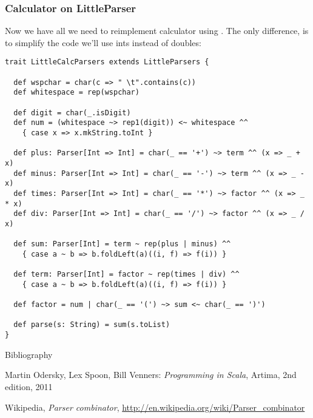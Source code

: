 \documentclass[t]{beamer}
\begin{document}
\begin{frame}[fragile]
\frametitle{Calculator on LittleParser}
Now we have all we need to reimplement calculator using .
The only difference, is to simplify the code we'll use ints instead of doubles:
\begin{lstlisting}
trait LittleCalcParsers extends LittleParsers {

  def wspchar = char(c => " \t".contains(c))
  def whitespace = rep(wspchar)

  def digit = char(_.isDigit)
  def num = (whitespace ~> rep1(digit)) <~ whitespace ^^
    { case x => x.mkString.toInt }

  def plus: Parser[Int => Int] = char(_ == '+') ~> term ^^ (x => _ + x)
  def minus: Parser[Int => Int] = char(_ == '-') ~> term ^^ (x => _ - x)
  def times: Parser[Int => Int] = char(_ == '*') ~> factor ^^ (x => _ * x)
  def div: Parser[Int => Int] = char(_ == '/') ~> factor ^^ (x => _ / x)

  def sum: Parser[Int] = term ~ rep(plus | minus) ^^
    { case a ~ b => b.foldLeft(a)((i, f) => f(i)) }

  def term: Parser[Int] = factor ~ rep(times | div) ^^
    { case a ~ b => b.foldLeft(a)((i, f) => f(i)) }

  def factor = num | char(_ == '(') ~> sum <~ char(_ == ')')

  def parse(s: String) = sum(s.toList)
}
\end{lstlisting}
\end{frame}

\begin{frame}{Bibliography}
\begin{thebibliography}{00}
Martin Odersky, Lex Spoon, Bill Venners:
\emph{Programming in Scala},
Artima, 2nd edition, 2011

Wikipedia, \emph{Parser combinator}, \url{http://en.wikipedia.org/wiki/Parser_combinator}
\end{thebibliography}
\end{frame}

\end{document}
